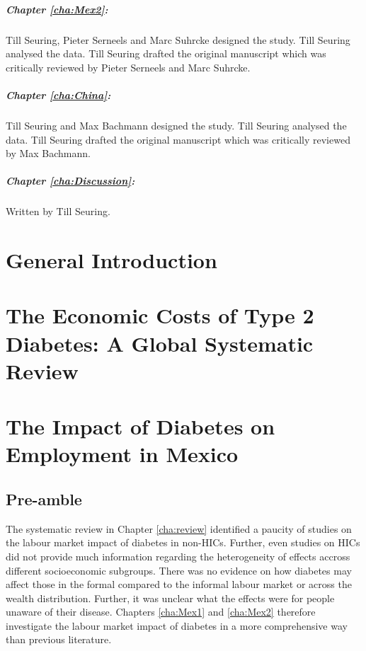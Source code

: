 {\paragraph{Chapter \ref{cha:Mex2}:} Till Seuring, Pieter Serneels and Marc Suhrcke designed the study. Till Seuring analysed the data. Till Seuring drafted the original manuscript which was critically reviewed by Pieter Serneels and Marc Suhrcke.

\paragraph{Chapter \ref{cha:China}:} Till Seuring and Max Bachmann designed the study. Till Seuring analysed the data. Till Seuring drafted the original manuscript which was critically reviewed by Max Bachmann.

\paragraph{Chapter \ref{cha:Discussion}:} Written by Till Seuring.



\chapter{\label{cha:intro}General Introduction}

\acresetall  %
\chapter{\label{cha:review}The Economic Costs of Type 2 Diabetes: A Global Systematic Review}

\acresetall  %
\chapter{\label{cha:Mex1}The Impact of Diabetes on Employment in Mexico}
\section*{Pre-amble}

The systematic review in Chapter \ref{cha:review} identified a paucity of studies on the labour market impact of diabetes in non-\acp{HIC}. Further, even studies on \acp{HIC} did not provide much information regarding the heterogeneity of effects accross different socioeconomic subgroups. There was no evidence on how diabetes may affect those in the formal compared to the informal labour market or across the wealth distribution. Further, it was unclear what the effects were for people unaware of their disease. Chapters \ref{cha:Mex1} and \ref{cha:Mex2} therefore investigate the labour market impact of diabetes in a more comprehensive way than previous literature.

}
